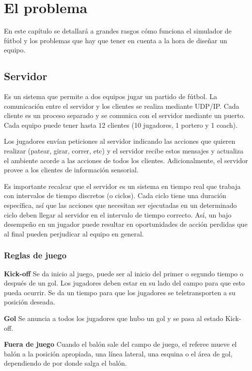 \chapter{El problema}

En este capítulo se detallará a grandes rasgos cómo funciona el simulador de fútbol y los problemas que hay que tener en cuenta a la hora de diseñar un equipo.

\section{Servidor}

Es un sistema que permite a dos equipos jugar un partido de fútbol. La comunicación entre el servidor y los clientes se realiza mediante UDP/IP. Cada cliente es un proceso separado y se comunica con el servidor mediante un puerto. Cada equipo puede tener hasta 12 clientes (10 jugadores, 1 portero y 1 coach).

Los jugadores envían peticiones al servidor indicando las acciones que quieren realizar (patear, girar, correr, etc) y el servidor recibe estos mensajes y actualiza el ambiente acorde a las acciones de todos los clientes. Adicionalmente, el servidor provee a los clientes de información sensorial.

Es importante recalcar que el servidor es un sistema en tiempo real que trabaja con intervalos de tiempo discretos (o ciclos). Cada ciclo tiene una duración específica, así que las acciones que necesitan ser ejecutadas en un determinado ciclo deben llegar al servidor en el intervalo de tiempo correcto. Así, un bajo desempeño en un jugador puede resultar en oportunidades de acción perdidas que al final pueden perjudicar al equipo en general.

\subsection{Reglas de juego}

\textbf{Kick-off}
Se da inicio al juego, puede ser al inicio del primer o segundo tiempo o después de un gol. Los jugadores deben estar en su lado del campo para que esto pueda ocurrir. Se da un tiempo para que los jugadores se teletransporten a su posición deseada.

\textbf{Gol}
Se anuncia a todos los jugadores que hubo un gol y se pasa al estado Kick-off.

\textbf{Fuera de juego}
Cuando el balón sale del campo de juego, el referee mueve el balón a la posición apropiada, una línea lateral, una esquina o el área de gol, dependiendo de por donde salga el balón.


